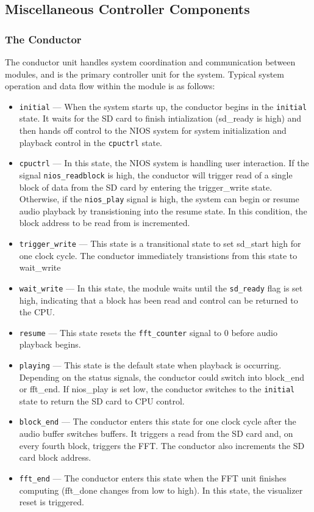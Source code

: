 \documentclass{article}
\begin{document}
\subsection{Miscellaneous Controller Components}
\subsubsection{The Conductor}
The conductor unit handles system coordination and communication between modules, and is the primary controller unit for the system. Typical system operation and data flow within the module is as follows:
\begin{itemize}
	\item \texttt{initial} --- When the system starts up, the conductor begins 
		in the \texttt{initial} state. It waits for the SD card to finish 
		intialization (sd\_ready is high) and then hands off control to the NIOS 
		system for system initialization and playback control in the 
		\texttt{cpuctrl} state.
	\item \texttt{cpuctrl} --- In this state, the NIOS system is handling user 
		interaction. If the signal \texttt{nios\_readblock} is high, the 
		conductor will trigger read of a single block of data from the SD card
		by entering the trigger\_write state. Otherwise, if the \texttt{nios\_play} 
		signal is high, the system can begin or resume audio playback by 
		transistioning into the resume state. In this condition, the block 
		address to be read from is incremented.
	\item \texttt{trigger\_write} --- This state is a transitional state to set
		sd\_start high for one clock cycle. The conductor immediately 
		transistions from this state to wait\_write
	\item \texttt{wait\_write} --- In this state, the module waits until the 
		\texttt{sd\_ready} flag is set high, indicating that a block has been 
		read and control can be returned to the CPU.
	\item \texttt{resume} --- This state resets the \texttt{fft\_counter} 
		signal to 0 before audio playback begins.
	\item \texttt{playing} --- This state is the default state when playback
		is occurring. Depending on the status signals, the conductor could
		switch into block\_end or fft\_end. If nios\_play is set low, the
		conductor switches to the \texttt{initial} state to return the SD card 
		to CPU control.
	\item \texttt{block\_end} --- The conductor enters this state for one
		clock cycle after the audio buffer switches buffers. It triggers a 
		read from the SD card and, on every fourth block, triggers the FFT.
		The conductor also increments the SD card block address.
	\item \texttt{fft\_end} --- The conductor enters this state when the FFT
		unit finishes computing (fft\_done changes from low to high). In this
		state, the visualizer reset is triggered.
\end{itemize}
\end{document}
